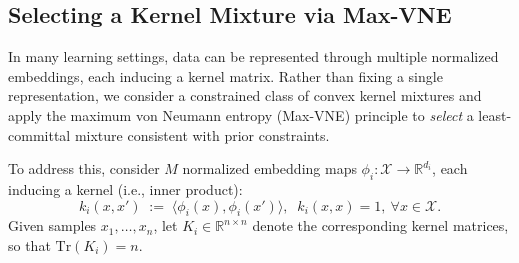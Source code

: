 \documentclass{article}
\theoremstyle{plain}
\theoremstyle{definition}
\begin{document}
\subsection{Selecting a Kernel Mixture via Max-VNE}
\label{subsec:mixture}

In many learning settings, data can be represented through multiple normalized
embeddings, each inducing a kernel matrix.
Rather than fixing a single representation, we consider a constrained class of
convex kernel mixtures and apply the maximum von Neumann entropy (Max-VNE)
principle to \emph{select} a least-committal mixture consistent with prior
constraints.

To address this, consider \(M\) normalized embedding maps
\(
\phi_i:\mathcal{X}\to\mathbb{R}^{d_i}
\),
each inducing a kernel (i.e., inner product):
\begin{equation}
k_i(x,x')
\;:=\;
\bigl\langle \phi_i(x), \phi_i(x') \bigr\rangle,
\;\;
k_i(x,x)=1,\ \forall x\in\mathcal{X}.
\label{eq:base-kernels}
\end{equation}
Given samples \(x_1,\dots,x_n\), let \(K_i\in\mathbb{R}^{n\times n}\) denote the
corresponding kernel matrices, so that \(\mathrm{Tr}(K_i)=n\).
\end{document}
